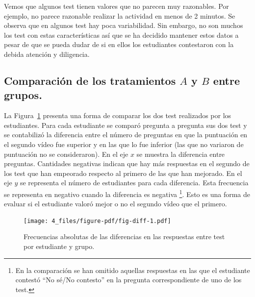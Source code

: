 \documentclass[
  12pt,
  a4paper,
  extrafontsizes,
  onecolumn,
  openright,
  table]{memoir}
\begin{document}
Vemos que algunos test tienen valores que no parecen muy razonables. Por
ejemplo, no parece razonable realizar la actividad en menos de 2
minutos. Se observa que en algunos test hay poca variabilidad. Sin
embargo, no son muchos los test con estas características así que se ha
decidido mantener estos datos a pesar de que se pueda dudar de si en
ellos los estudiantes contestaron con la debida atención y diligencia.

\hypertarget{sec-eda-3}{%
\subsection{\texorpdfstring{Comparación de los tratamientos \(A\) y
\(B\) entre
grupos.}{Comparación de los tratamientos A y B entre grupos.}}\label{sec-eda-3}}

La Figura~\ref{fig-diff} presenta una forma de comparar los dos test
realizados por los estudiantes. Para cada estudiante se comparó pregunta
a pregunta sus dos test y se contabilizó la diferencia entre el número
de preguntas en que la puntuación en el segundo vídeo fue superior y en
las que lo fue inferior (las que no variaron de puntuación no se
consideraron). En el eje \(x\) se muestra la diferencia entre preguntas.
Cantidades negativas indican que hay más respuestas en el segundo de los
test que han empeorado respecto al primero de las que han mejorado. En
el eje \(y\) se representa el número de estudiantes para cada
diferencia. Esta frecuencia se representa en negativo cuando la
diferencia es negativa \footnote{En la comparación se han omitido
  aquellas respuestas en las que el estudiante contestó \enquote{No
  sé/No contesto} en la pregunta correspondiente de uno de los test.}.
Esto es una forma de evaluar si el estudiante valoró mejor o no el
segundo vídeo que el primero.

\begin{figure}[h]

{\centering \texttt{[image: 4\_files/figure-pdf/fig-diff-1.pdf]}

}

\caption{\label{fig-diff}Frecuencias absolutas de las diferencias en las
respuestas entre test por estudiante y grupo.}

\end{figure}
\end{document}
